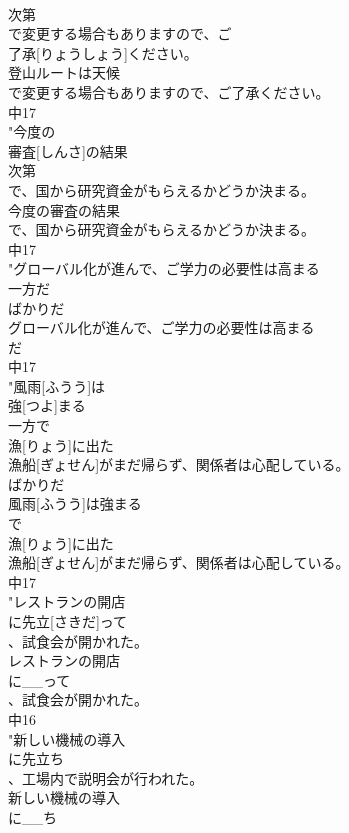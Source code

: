 \documentclass[8pt]{extreport}
\begin{document}
\begin{CJK}{UTF8}{min}
\\	次第
\\	で変更する場合もありますので、ご
\\	了承[りょうしょう]ください。
\\	登山ルートは天候
\\	で変更する場合もありますので、ご了承ください。
\\	中17
\\	"今度の
\\	審査[しんさ]の結果
\\	次第
\\	で、国から研究資金がもらえるかどうか決まる。
\\	今度の審査の結果
\\	で、国から研究資金がもらえるかどうか決まる。
\\	中17
\\	"グローバル化が進んで、ご学力の必要性は高まる
\\	一方だ
\\	ばかりだ
\\	グローバル化が進んで、ご学力の必要性は高まる
\\	だ
\\	中17
\\	"風雨[ふうう]は
\\	強[つよ]まる
\\	一方で
\\	漁[りょう]に出た
\\	漁船[ぎょせん]がまだ帰らず、関係者は心配している。
\\	ばかりだ
\\	風雨[ふうう]は強まる
\\	で
\\	漁[りょう]に出た
\\	漁船[ぎょせん]がまだ帰らず、関係者は心配している。
\\	中17
\\	"レストランの開店
\\	に先立[さきだ]って
\\	、試食会が開かれた。
\\	レストランの開店
\\	に__って
\\	、試食会が開かれた。
\\	中16
\\	"新しい機械の導入
\\	に先立ち
\\	、工場内で説明会が行われた。
\\	新しい機械の導入
\\	に__ち

\end{CJK}
\end{document}
